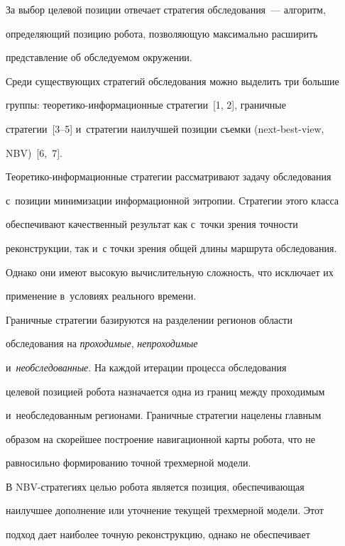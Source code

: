   

  За выбор целевой позиции отвечает стратегия обследования~--- алгоритм, 

определяющий позицию робота, позволяющую максимально расширить 

пред\-став\-ле\-ние об обследуемом окружении.

  

  Среди существующих стратегий обследования можно выделить три большие 

группы: теоретико-информационные стратегии~[1, 2], граничные  

стратегии~[3--5] и~стратегии наилучшей позиции съемки (next-best-view, 

NBV)~[6,~7]. 

  

  Теоретико-информационные стратегии рассматривают задачу обследования 

с~позиции минимизации информационной энтропии. Стратегии этого класса 

обеспечивают качественный результат как с~точки зрения точности 

реконструкции, так и~с точки зрения общей длины маршрута обследования. 

Однако они имеют высокую вычислительную сложность, что исключает их 

применение в~условиях реального времени.

  

  Граничные стратегии базируются на разделении регионов области 

обследования на \textit{проходимые}, \textit{непроходимые} 

и~\textit{необследованные}. На каждой итерации процесса обследования 

целевой позицией робота назначается одна из границ между проходимым 

и~необследованным регионами. Граничные стратегии нацелены главным 

образом на скорейшее построение навигационной карты робота, что не 

равносильно формированию точной трехмерной модели.

  

  В NBV-стратегиях целью робота является позиция, обеспечивающая 

наилучшее дополнение или уточнение текущей трехмерной модели. Этот 

подход дает наиболее точную реконструкцию, однако не обеспечивает 

